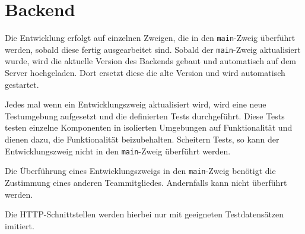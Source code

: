 \section{Backend}\label{CICD_Backend}

Die Entwicklung erfolgt auf einzelnen Zweigen, die in den \verb#main#-Zweig überführt werden, sobald diese fertig ausgearbeitet sind.
Sobald der \verb#main#-Zweig aktualisiert wurde, wird die aktuelle Version des Backends gebaut und automatisch auf dem Server hochgeladen.
Dort ersetzt diese die alte Version und wird automatisch gestartet.

Jedes mal wenn ein Entwicklungszweig aktualisiert wird, wird eine neue Testumgebung aufgesetzt und die definierten Tests durchgeführt.
Diese Tests testen einzelne Komponenten in isolierten Umgebungen auf Funktionalität und dienen dazu, die Funktionalität beizubehalten.
Scheitern Tests, so kann der Entwicklungszweig nicht in den \verb#main#-Zweig überführt werden.

Die Überführung eines Entwicklungszweigs in den \verb#main#-Zweig benötigt die Zustimmung eines anderen Teammitgliedes.
Andernfalls kann nicht überführt werden.

Die HTTP-Schnittstellen werden hierbei nur mit geeigneten Testdatensätzen imitiert.